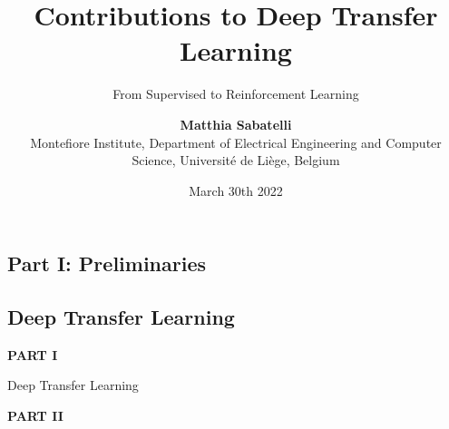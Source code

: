\documentclass{beamer}
\title{Contributions to Deep Transfer Learning}
\subtitle{From Supervised to Reinforcement Learning}
\author{\textbf{Matthia Sabatelli} \\ Montefiore Institute, Department of Electrical Engineering and Computer Science, Universit\'e de Li\`ege, Belgium}
\date{March 30th 2022}
\begin{document}
\frame{\titlepage} 



\begin{frame}
	\section{Part I: Preliminaries}
	\subsection{Deep Transfer Learning}
\end{frame}



\begin{frame}
	\begin{center}
		\textcolor{skymagenta}{\textbf{PART I}}
	\end{center}
\end{frame}


\begin{frame}{Deep Transfer Learning}

\end{frame}




\begin{frame}
	\begin{center}
		\textcolor{skymagenta}{\textbf{PART II}}
	\end{center}
\end{frame}
\end{document}
